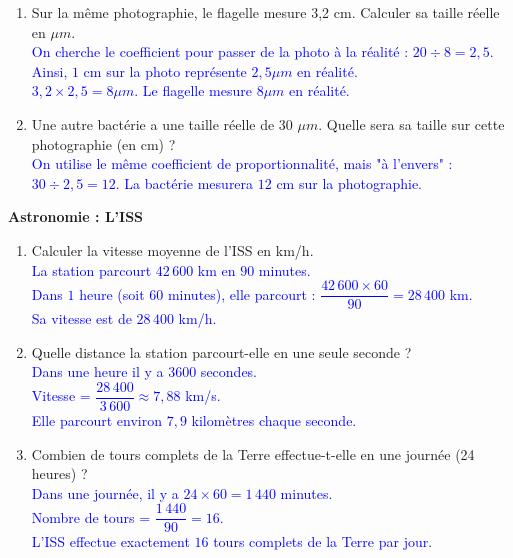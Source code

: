 \documentclass[a4paper]{book}
\begin{document}
{\begin{exercice}
\begin{enumerate}
            \item Sur la même photographie, le flagelle mesure 3,2 cm. Calculer sa taille réelle en $\mu m$. \\
            \textcolor{blue}{On cherche le coefficient pour passer de la photo à la réalité : $20 \div 8 = 2,5$. \\ Ainsi, $1$ cm sur la photo représente $2,5 \mu m$ en réalité. \\ $3,2 \times 2,5 = 8 \mu m$. Le flagelle mesure $8 \mu m$ en réalité.}

\newpage
            
            \item Une autre bactérie a une taille réelle de 30 $\mu m$. Quelle sera sa taille sur cette photographie (en cm) ? \\
            \textcolor{blue}{On utilise le même coefficient de proportionnalité, mais "à l'envers" : \\ $30 \div 2,5 = 12$. La bactérie mesurera $12$ cm sur la photographie.}
        \end{enumerate}
    \end{exercice}

    \vspace{0.5cm}

    \begin{exercice}
        \textbf{Astronomie : L'ISS} 
    
        \begin{enumerate}
            \item Calculer la vitesse moyenne de l'ISS en km/h. \\
            \textcolor{blue}{La station parcourt $42\,600$ km en $90$ minutes. \\ Dans $1$ heure (soit $60$ minutes), elle parcourt : $\dfrac{42\,600 \times 60}{90} = 28\,400$ km. \\ Sa vitesse est de $28\,400$ km/h.}
            
            \item Quelle distance la station parcourt-elle en une seule seconde ? \\
            \textcolor{blue}{Dans une heure il y a 3600 secondes. \\ Vitesse = $\dfrac{28\,400}{3\,600} \approx 7,88$ km/s. \\ Elle parcourt environ $7,9$ kilomètres chaque seconde.}
            
            \item Combien de tours complets de la Terre effectue-t-elle en une journée (24 heures) ? \\
            \textcolor{blue}{Dans une journée, il y a $24 \times 60 = 1\,440$ minutes. \\ Nombre de tours = $\dfrac{1\,440}{90} = 16$. \\ L'ISS effectue exactement $16$ tours complets de la Terre par jour.}


\end{enumerate}
\end{exercice}}
\end{document}
